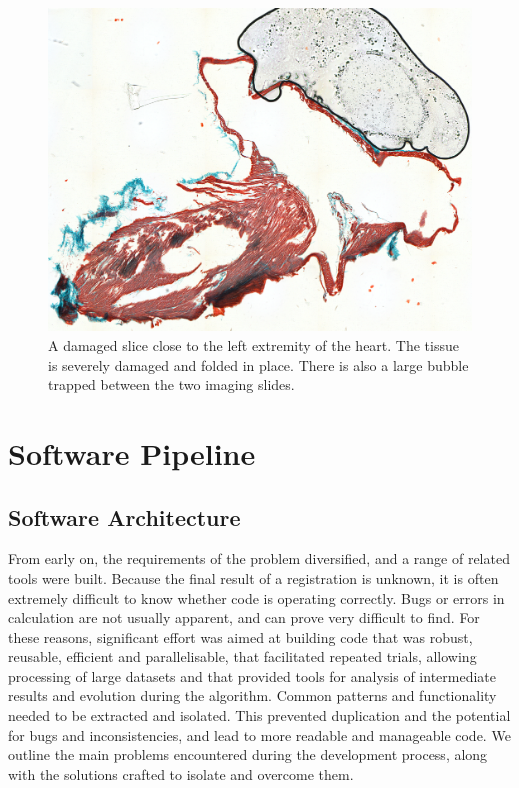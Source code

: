     \begin{figure}[htbp]
      \centering
      \includegraphics[width=.8\textwidth]{Ch5/Figs/damaged_slice}
      \caption{A damaged slice close to the left extremity of the heart. The tissue is severely damaged and folded in place. There is also a large bubble trapped between the two imaging slides.}
      \label{fig:damaged_slice}
    \end{figure}
    
  

\section{Software Pipeline} %
\label{sec:software_pipeline}
  \subsection{Software Architecture} %
  \label{sub:software_architecture}
		From early on, the requirements of the problem diversified, and a range of related tools were built. Because the final result of a registration is unknown, it is often extremely difficult to know whether code is operating correctly. Bugs or errors in calculation are not usually apparent, and can prove very difficult to find. For these reasons, significant effort was aimed at building code that was robust, reusable, efficient and parallelisable, that facilitated repeated trials, allowing processing of large datasets and that provided tools for analysis of intermediate results and evolution during the algorithm. Common patterns and functionality needed to be extracted and isolated. This prevented duplication and the potential for bugs and inconsistencies, and lead to more readable and manageable code. We outline the main problems encountered during the development process, along with the solutions crafted to isolate and overcome them.
		
